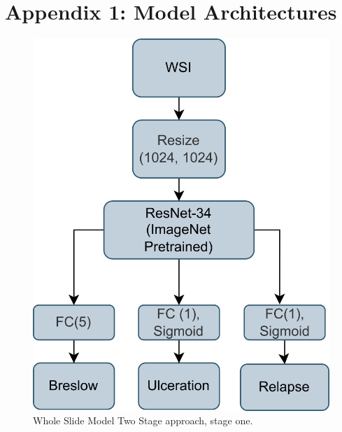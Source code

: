 \documentclass[conference]{IEEEtran}
\begin{document}
\section{Appendix 1: Model Architectures}
\begin{figure}[h!]
  \centering
    \includegraphics[scale=0.55]{images/page1.png}
  \caption{Whole Slide Model Two Stage approach, stage one.}
  \label{fig:wsi_s1}
\end{figure}
\end{document}
